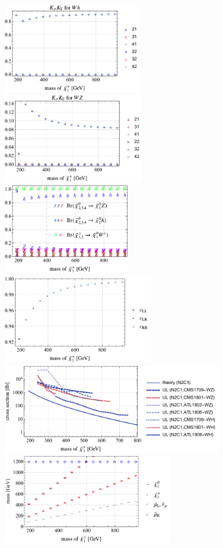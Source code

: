\documentclass[a4paper,10pt,captions=tableheading,DIV=14]{scrartcl}
\numberwithin{equation}{section}
\begin{document}
\begin{figure}[h!]\centering
  \includegraphics[height=110pt]{../plots/plot_tab2boson_WH.pdf}
  \includegraphics[height=110pt]{../plots/plot_tab2boson_WZ.pdf}
  \includegraphics[height=110pt]{../plots/plot_tab2boson_br.pdf}
  \includegraphics[height=110pt]{../plots/plot_tab2boson_cfactors.pdf}
  \includegraphics[height=110pt]{../plots/plot_tab2boson_limit.pdf}
  \includegraphics[height=110pt]{../plots/plot_tab2boson_mass.pdf}
\end{figure}
\end{document}
